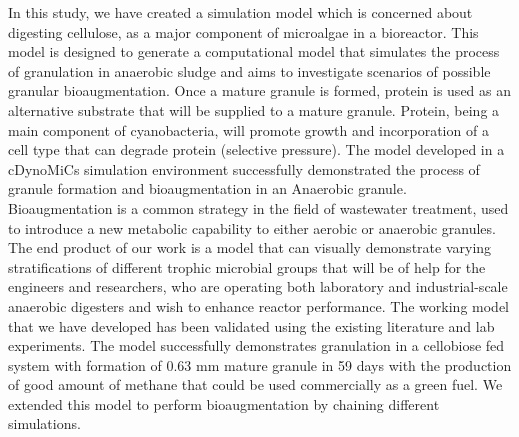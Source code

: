 %
%
%

\begin{publicabstract}

In this study, we have created a simulation model which is concerned about digesting cellulose, as a major component of microalgae in a bioreactor. This model is designed to generate a computational model that simulates the process of granulation in anaerobic sludge and aims to investigate scenarios of possible granular bioaugmentation. Once a mature granule is formed, protein is used as an alternative substrate that will be supplied to a mature granule. Protein, being a main component of cyanobacteria, will promote growth and incorporation of a cell type that can degrade protein (selective pressure). The model developed in a cDynoMiCs simulation environment successfully demonstrated the process of granule formation and bioaugmentation in an Anaerobic granule.{\cite{koon}}
Bioaugmentation is a common strategy in the field of wastewater treatment, used to introduce a new metabolic capability to either aerobic or anaerobic granules. The end product of our work is a model that can visually demonstrate varying stratifications of different trophic microbial groups that will be of help for the engineers and researchers, who are operating both laboratory and industrial-scale anaerobic digesters and wish to enhance reactor performance.  
The working model that we have developed has been validated using the existing literature and lab experiments. The model successfully demonstrates granulation in a cellobiose fed system with formation of 0.63 mm mature granule in 59 days with the production of good amount of methane that could be used commercially as a green fuel. We extended this model to perform bioaugmentation by chaining different simulations. 


\end{publicabstract}


